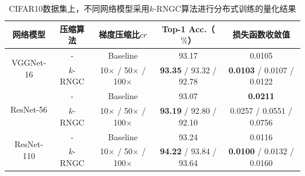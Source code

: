 \documentclass{xdupgthesis}
\begin{document}
\renewcommand{\arraystretch}{1.3}
\begin{table}[ht]
    \centering
    \begin{threeparttable}
        \caption{CIFAR10数据集上，不同网络模型采用$k$-RNGC算法进行分布式训练的量化结果}
        \label{tab_Result-k-rngc-CIFAR10}
        \begin{tabular}{c|c|c|c|c}
            \toprule
            \toprule
            网络模型 & 压缩算法 & 梯度压缩比$cr$ & Top-1 Acc.（$\%$） & 损失函数收敛值 \\ 
            \midrule
            \multirow{2}{*}{VGGNet-16} & - & Baseline & 93.17 & 0.0105 \\
                & $k$-RNGC & 10$\times$ / 50$\times$ / 100$\times$ & \textbf{93.35} / 93.32 / 92.78 & \textbf{0.0103} / 0.0107 / 0.0122 \\
            \midrule 
            \multirow{2}{*}{ResNet-56} & - & Baseline & 93.07 & \textbf{0.0211} \\
                & $k$-RNGC & 10$\times$ / 50$\times$ / 100$\times$ & \textbf{93.19} / 92.80 / 92.10 & 0.0257 / 0.0551 / 0.0756 \\
            \midrule
            \multirow{2}{*}{ResNet-110} & - & Baseline & 93.24 & 0.0116 \\
             & $k$-RNGC & 10$\times$ / 50$\times$ / 100$\times$ & \textbf{94.22} / 93.84 / 93.64 & \textbf{0.0100} / 0.0132 / 0.0160 \\
            \bottomrule
            \bottomrule
        \end{tabular}
    \end{threeparttable}
\end{table}
\end{document}
